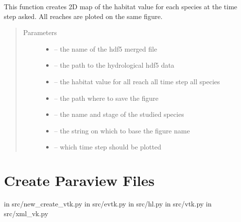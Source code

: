 \documentclass[letterpaper,10pt,english]{sphinxmanual}
\begin{document}
\begin{fulllineitems}
\label{\detokenize{index:src.calcul_hab.save_vh_fig_2d}}
This function creates 2D map of the habitat value for each species at
the time step asked. All reaches are ploted on the same figure.
\begin{quote}\begin{description}
\item[{Parameters}] \leavevmode\begin{itemize}
\item {} 
 -- the name of the hdf5 merged file

\item {} 
 -- the path to the hydrological hdf5 data

\item {} 
 -- the habitat value for all reach all time step all species

\item {} 
 -- the path where to save the figure

\item {} 
 -- the name and stage of the studied species

\item {} 
 -- the string on which to base the figure name

\item {} 
 -- which time step should be plotted

\end{itemize}

\end{description}\end{quote}

\end{fulllineitems}



\section{Create Paraview Files}
\label{\detokenize{index:create-paraview-files}}
in src/new\_create\_vtk.py
in src/evtk.py
in src/hl.py
in src/vtk.py
in src/xml\_vk.py
\end{document}
